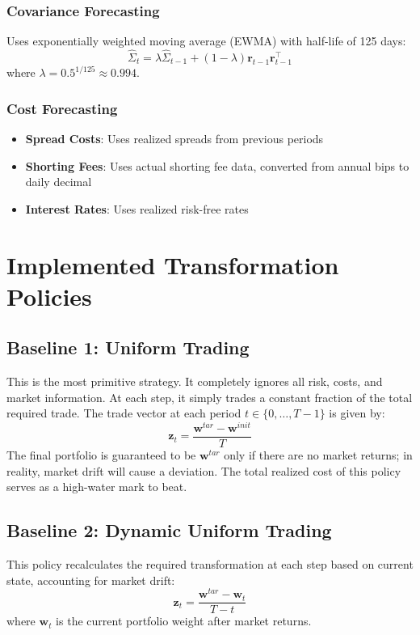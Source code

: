 \documentclass[11pt, letterpaper]{article}
\newcommand{\vect}[1]{\boldsymbol{#1}}
\begin{document}
\subsubsection{Covariance Forecasting}
Uses exponentially weighted moving average (EWMA) with half-life of 125 days:
\begin{equation}
\hat{\Sigma}_t = \lambda \hat{\Sigma}_{t-1} + (1-\lambda) \vect{r}_{t-1} \vect{r}_{t-1}^\top
\end{equation}
where $\lambda = 0.5^{1/125} \approx 0.994$.

\subsubsection{Cost Forecasting}
\begin{itemize}
    \item \textbf{Spread Costs}: Uses realized spreads from previous periods
    \item \textbf{Shorting Fees}: Uses actual shorting fee data, converted from annual bips to daily decimal
    \item \textbf{Interest Rates}: Uses realized risk-free rates
\end{itemize}

\section{Implemented Transformation Policies}

\subsection{Baseline 1: Uniform Trading}
This is the most primitive strategy. It completely ignores all risk, costs, and market information. At each step, it simply trades a constant fraction of the total required trade.
The trade vector at each period $t \in \{0, \dots, T-1\}$ is given by:
\[
\vect{z}_t = \frac{\vect{w}^{tar} - \vect{w}^{init}}{T}
\]
The final portfolio is guaranteed to be $\vect{w}^{tar}$ only if there are no market returns; in reality, market drift will cause a deviation. The total realized cost of this policy serves as a high-water mark to beat.

\subsection{Baseline 2: Dynamic Uniform Trading}
This policy recalculates the required transformation at each step based on current state, accounting for market drift:
\[
\vect{z}_t = \frac{\vect{w}^{tar} - \vect{w}_t}{T - t}
\]
where $\vect{w}_t$ is the current portfolio weight after market returns.
\end{document}
